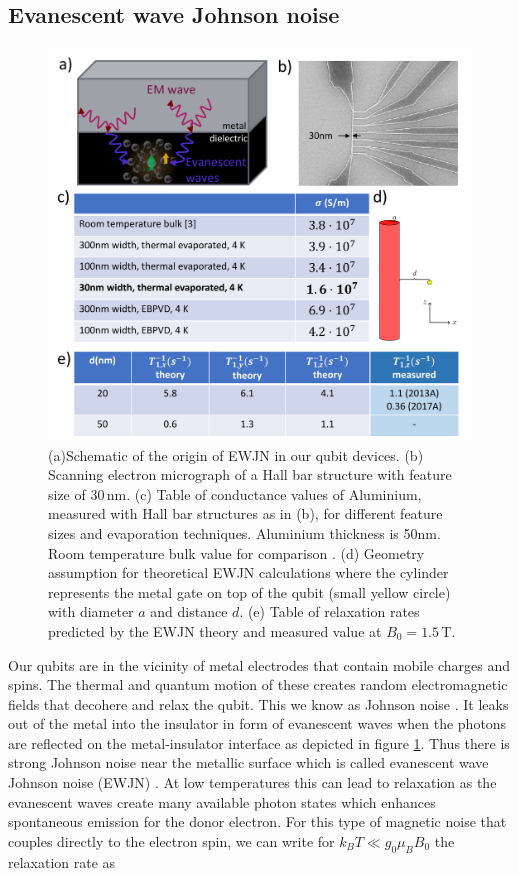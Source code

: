 \subsection{\label{sec:ewjn}Evanescent wave Johnson noise}

\begin{figure}
\centering
\includegraphics[width=\columnwidth]{figures/fig4.pdf}
\caption{
(a)Schematic of the origin of EWJN in our qubit devices. (b) Scanning electron micrograph of a Hall bar structure with feature size of $30\,$nm. (c) Table of conductance values of Aluminium, measured with  Hall bar structures as in (b), for different feature sizes and evaporation techniques. Aluminium thickness is 50nm. Room temperature bulk value for comparison \cite{Serway1998}. (d) Geometry assumption for theoretical EWJN calculations where the cylinder represents the metal gate on top of the qubit (small yellow circle) with diameter $a$ and distance $d$. (e) Table of relaxation rates predicted by the EWJN theory and measured value at $B_0=1.5\,$T. 
}
\label{fig:ewjn}
\end{figure}

Our qubits are in the vicinity of metal electrodes that contain mobile charges and spins. The thermal and quantum motion of these creates random electromagnetic fields that decohere and relax the qubit. This we know as Johnson noise \cite{Johnson1928, Nyquist1928, Callen1951}. It leaks out of the metal into the insulator in form of evanescent waves when the photons are reflected on the metal-insulator interface as depicted in figure \ref{fig:ewjn}. Thus there is strong Johnson noise near the metallic surface which is called evanescent wave Johnson noise (EWJN) \cite{Henkel1999, Poudel2013, Premakumar2017}. At low temperatures this can lead to relaxation as the evanescent waves create many available photon states which enhances spontaneous emission for the donor electron. For this type of magnetic noise that couples directly to the electron spin, we can write for $k_BT\ll g_0\mu_B B_0$ the relaxation rate as

